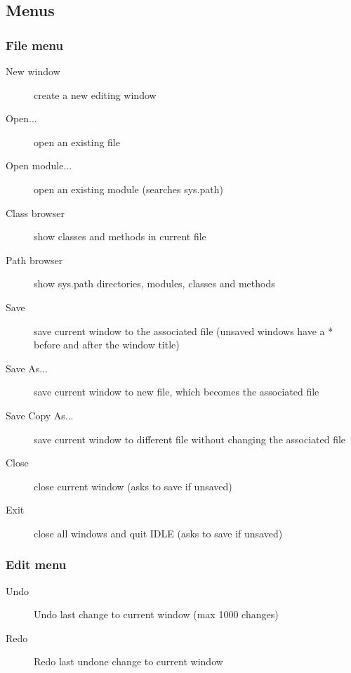 \subsection{Menus}

\subsubsection{File menu}

\begin{description}
\item[New window]     create a new editing window
\item[Open...]        open an existing file
\item[Open module...] open an existing module (searches sys.path)
\item[Class browser]  show classes and methods in current file
\item[Path browser]   show sys.path directories, modules, classes and methods
\end{description}

\begin{description}
\item[Save]   save current window to the associated file (unsaved
windows have a * before and after the window title)

\item[Save As...]     save current window to new file, which becomes
the associated file
\item[Save Copy As...]        save current window to different file
without changing the associated file
\end{description}

\begin{description}
\item[Close]  close current window (asks to save if unsaved)
\item[Exit]   close all windows and quit IDLE (asks to save if unsaved)
\end{description}


\subsubsection{Edit menu}

\begin{description}
\item[Undo]   Undo last change to current window (max 1000 changes)
\item[Redo]   Redo last undone change to current window
\end{description}

